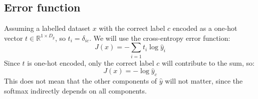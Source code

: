 \documentclass[12pt, a4paper]{article}
\numberwithin{equation}{section}
\begin{document}
\subsection{Error function}
Assuming a labelled dataset $x$ with the correct label $c$ encoded as a one-hot vector $t\in\mathbb{R}^{1\times D_y}$, so $t_i=\delta_{ic}$. We will use the cross-entropy error function:
\begin{equation}
J(x)=-\sum_{i=1}t_i\log\hat{y}_i
\end{equation}
Since $t$ is one-hot encoded, only the correct label $c$ will contribute to the sum, so:
\begin{equation}
J(x)=-\log\hat{y}_c
\end{equation}
This does not mean that the other components of $\hat{y}$ will not matter, since the softmax indirectly depends on all components.
\end{document}
